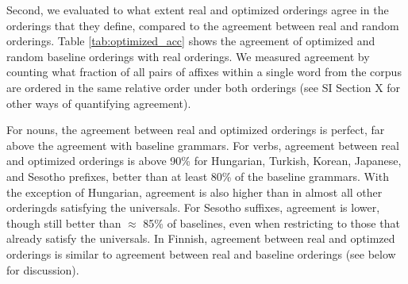 \documentclass[11pt,letterpaper]{article}
\newcounter{def}
\begin{document}
Second, we evaluated to what extent real and optimized orderings agree in the orderings that they define, compared to the agreement between real and random orderings.
Table \ref{tab:optimized_acc} shows the agreement of optimized and random baseline orderings with real orderings.
We measured agreement by counting what fraction of all pairs of affixes within a single word from the corpus are ordered in the same relative order under both orderings (see SI Section X for other ways of quantifying agreement).


For nouns, the agreement between real and optimized orderings is perfect, far above the agreement with baseline grammars. 
For verbs, agreement between real and optimized orderings is above 90\% for Hungarian, Turkish, Korean, Japanese, and Sesotho prefixes, better than at least 80\% of the baseline grammars.
With the exception of Hungarian, agreement is also higher than in almost all other orderingds satisfying the universals.
For Sesotho suffixes, agreement is lower, though still better than $\approx$ 85\% of baselines, even when restricting to those that already satisfy the universals.
In Finnish, agreement between real and optimzed orderings is similar to agreement between real and baseline orderings (see below for discussion).
\end{document}
